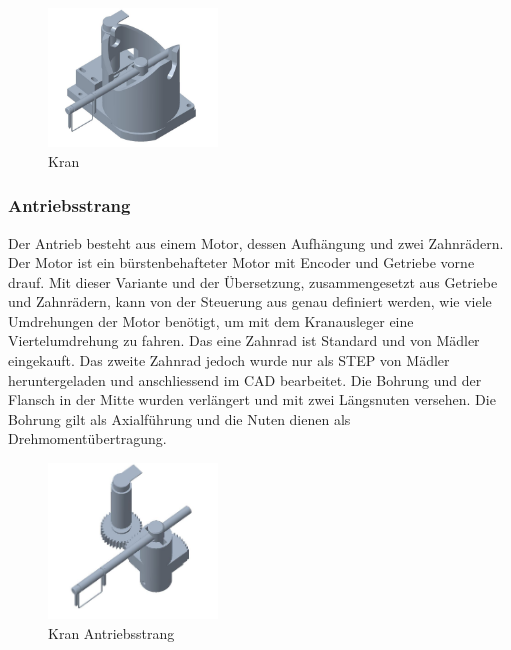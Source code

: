 \documentclass[../../main.tex]{subfiles}
\begin{document}
        \begin{figure}[H]
            \centering
            \includegraphics[width=0.4\textwidth]{WuerfelaufnahmeBG.JPG}
            \caption {Kran}
        \end{figure}



    \subsubsection{Antriebsstrang}
        Der Antrieb besteht aus einem Motor, dessen Aufhängung und zwei Zahnrädern. Der Motor ist ein bürstenbehafteter
        Motor mit Encoder und Getriebe vorne drauf. Mit dieser Variante und der Übersetzung, zusammengesetzt aus Getriebe
        und Zahnrädern, kann von der Steuerung aus genau definiert werden, wie viele Umdrehungen der Motor benötigt, um
        mit dem Kranausleger eine Viertelumdrehung zu fahren. Das eine Zahnrad ist Standard und von Mädler eingekauft.
        Das zweite Zahnrad jedoch wurde nur als STEP von Mädler heruntergeladen und anschliessend im CAD bearbeitet. Die
        Bohrung und der Flansch in der Mitte wurden verlängert und mit zwei Längsnuten versehen. Die Bohrung gilt als
        Axialführung und die Nuten dienen als Drehmomentübertragung.
        \begin{figure}[H]
            \centering
            \includegraphics[width=0.4\textwidth]{Mechanismus.JPG}
            \caption {Kran Antriebsstrang}
        \end{figure}
\end{document}
